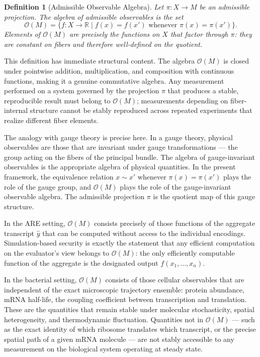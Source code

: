 \documentclass[12pt, a4paper]{article}
\theoremstyle{essaystyle}
\newtheorem{definition}{Definition}
\begin{document}
\begin{definition}[Admissible Observable Algebra]
Let $\pi : X \to M$ be an admissible projection. The \emph{algebra of admissible
observables} is the set
\[
\mathcal{O}(M) = \bigl\{ f : X \to \mathbb{R} \;\big|\; f(x) = f(x') \text{ whenever }
\pi(x) = \pi(x') \bigr\}.
\]
Elements of $\mathcal{O}(M)$ are precisely the functions on $X$ that factor through
$\pi$: they are constant on fibers and therefore well-defined on the quotient.
\end{definition}

This definition has immediate structural content. The algebra $\mathcal{O}(M)$ is
closed under pointwise addition, multiplication, and composition with continuous
functions, making it a genuine commutative algebra. Any measurement performed on a
system governed by the projection $\pi$ that produces a stable, reproducible result
must belong to $\mathcal{O}(M)$; measurements depending on fiber-internal structure
cannot be stably reproduced across repeated experiments that realize different fiber
elements.

The analogy with gauge theory is precise here. In a gauge theory, physical observables
are those that are invariant under gauge transformations --- the group acting on the
fibers of the principal bundle. The algebra of gauge-invariant observables is the
appropriate algebra of physical quantities. In the present framework, the equivalence
relation $x \sim x'$ whenever $\pi(x) = \pi(x')$ plays the role of the gauge group,
and $\mathcal{O}(M)$ plays the role of the gauge-invariant observable algebra. The
admissible projection $\pi$ is the quotient map of this gauge structure.

In the ARE setting, $\mathcal{O}(M)$ consists precisely of those functions of the
aggregate transcript $\hat{y}$ that can be computed without access to the individual
encodings. Simulation-based security is exactly the statement that any efficient
computation on the evaluator's view belongs to $\mathcal{O}(M)$: the only efficiently
computable function of the aggregate is the designated output $f(x_1, \ldots, x_n)$.

In the bacterial setting, $\mathcal{O}(M)$ consists of those cellular observables that
are independent of the exact microscopic trajectory ensemble: protein abundance, mRNA
half-life, the coupling coefficient between transcription and translation. These are the
quantities that remain stable under molecular stochasticity, spatial heterogeneity, and
thermodynamic fluctuation. Quantities not in $\mathcal{O}(M)$ --- such as the exact
identity of which ribosome translates which transcript, or the precise spatial path of
a given mRNA molecule --- are not stably accessible to any measurement on the
biological system operating at steady state.
\end{document}
